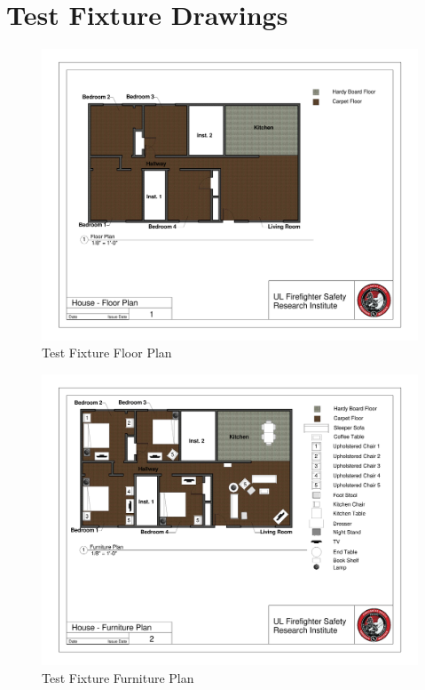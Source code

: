 \clearpage		\large
\chapter{Test Fixture Drawings} \label{App:test_figure_drawings}

\begin{figure}
\includegraphics[width=\textheight]{../0_Images/Appendix_Figures/Floor_Plan}
\caption[]{Test Fixture Floor Plan}
\label{fig:appendix_floorplan}
\end{figure}

\begin{figure}
\includegraphics[width=\textheight]{../0_Images/Appendix_Figures/Furniture_Plan}
\caption[]{Test Fixture Furniture Plan}
\label{fig:appendix_furnitureplan}
\end{figure}

